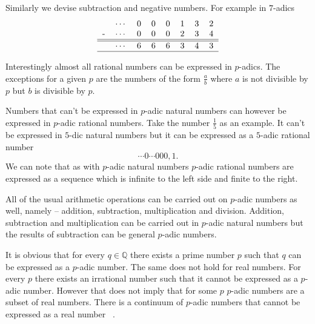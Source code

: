 \documentclass{llncs}
\begin{document}
Similarly we devise subtraction and negative numbers. For example in $7$-adics
\[
\begin{tabular}{rrrrrrrrr|}
&$\cdots$ &0 &0 &0 &1 &3 &2\\
-&$\cdots$ &0 &0 &0 &2 &3 &4\\
\hline
\hline
&$\cdots$ &6 &6 &6 &3 &4 &3\\
\hline
\end{tabular}
\]

Interestingly almost all rational numbers can be expressed in $p$-adics. The exceptions for a given $p$ are the numbers of the form $\frac{a}{b}$  where $a$ is not divisible by $p$ but $b$ is divisible by $p$.

Numbers that can't be expressed in $p$-adic natural numbers can however be expressed in $p$-adic rational numbers. Take the number $\frac{1}{5}$ as an example. It can't be expressed in $5$-dic natural numbers but it can be expressed as a $5$-adic rational number
\[
\cdots 0 \cdots 000,1.
\]
We can note that as with $p$-adic natural numbers $p$-adic rational numbers are expressed as a sequence which is infinite to the left side and finite to the right.

All of the usual arithmetic operations can be carried out on $p$-adic numbers as well, namely -- addition, subtraction, multiplication and division. Addition, subtraction and multiplication can be carried out in $p$-adic natural numbers %
but the results of subtraction can be general $p$-adic numbers.

It is obvious that for every $q \in \mathbb{Q}$ there exists a prime number $p$ such that $q$ can be expressed as a $p$-adic number. The same does not hold for real numbers. For every $p$ there exists an irrational number such that it cannot be expressed as a $p$-adic number. However that does not imply that for some $p$ $p$-adic numbers are a subset of real numbers. There is a continuum of $p$-adic numbers %
that cannot be expressed as a real number ~\citep{Freivalds2012}.
\end{document}
